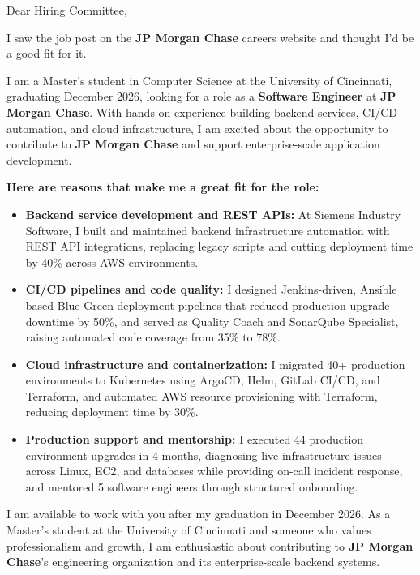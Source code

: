 \documentclass[11pt]{letter}
\date{}
\begin{document}
\begin{letter}{}

\opening{Dear Hiring Committee,}

I saw the job post on the \textbf{JP Morgan Chase} careers website and thought I'd be a good fit for it.

I am a Master's student in Computer Science at the University of Cincinnati, graduating December 2026, looking for a role as a \textbf{Software Engineer} at \textbf{JP Morgan Chase}. With hands on experience building backend services, CI/CD automation, and cloud infrastructure, I am excited about the opportunity to contribute to \textbf{JP Morgan Chase} and support enterprise-scale application development.

\textbf{Here are reasons that make me a great fit for the role:}

\begin{itemize}[leftmargin=*, itemsep=0.45em]
    \item \textbf{Backend service development and REST APIs:} At Siemens Industry Software, I built and maintained backend infrastructure automation with REST API integrations, replacing legacy scripts and cutting deployment time by 40\% across AWS environments.

    \item \textbf{CI/CD pipelines and code quality:} I designed Jenkins-driven, Ansible based Blue-Green deployment pipelines that reduced production upgrade downtime by 50\%, and served as Quality Coach and SonarQube Specialist, raising automated code coverage from 35\% to 78\%.

    \item \textbf{Cloud infrastructure and containerization:} I migrated 40+ production environments to Kubernetes using ArgoCD, Helm, GitLab CI/CD, and Terraform, and automated AWS resource provisioning with Terraform, reducing deployment time by 30\%.

    \item \textbf{Production support and mentorship:} I executed 44 production environment upgrades in 4 months, diagnosing live infrastructure issues across Linux, EC2, and databases while providing on-call incident response, and mentored 5 software engineers through structured onboarding.
\end{itemize}

I am available to work with you after my graduation in December 2026. As a Master's student at the University of Cincinnati and someone who values professionalism and growth, I am enthusiastic about contributing to \textbf{JP Morgan Chase}'s engineering organization and its enterprise-scale backend systems.


\end{letter}
\end{document}
